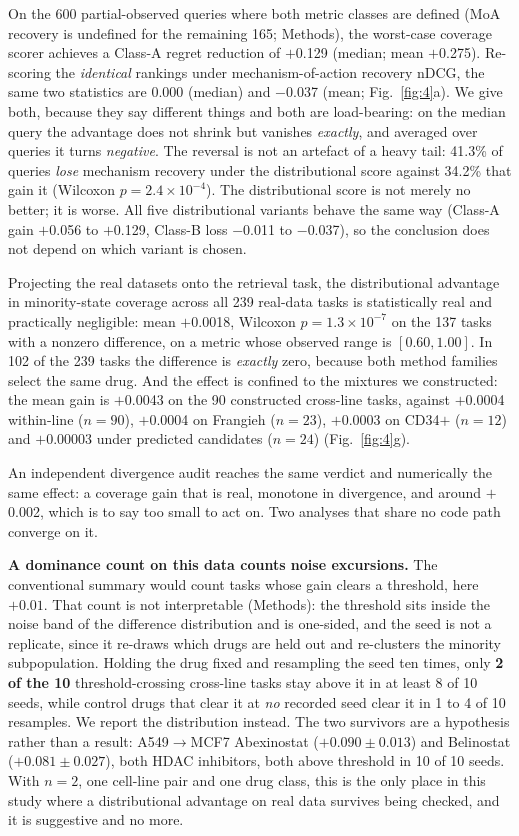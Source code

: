 \documentclass[11pt,letterpaper]{article}
\newcommand{\CONTROLRANGE}{1 to 4}
\begin{document}
On the 600 partial-observed queries where both metric classes are defined (MoA recovery is
undefined for the remaining 165; Methods), the worst-case coverage scorer achieves a Class-A
regret reduction of $+$0.129 (median; mean $+$0.275). Re-scoring the \emph{identical}
rankings under mechanism-of-action recovery nDCG, the same two statistics are 0.000
(median) and $-$0.037 (mean; Fig.~\ref{fig:4}a). We give both, because they say
different things and both are load-bearing: on the median query the advantage does not shrink
but vanishes \emph{exactly}, and averaged over queries it turns \emph{negative}. The reversal is
not an artefact of a heavy tail: 41.3\% of queries \emph{lose} mechanism recovery under the
distributional score against 34.2\% that gain it (Wilcoxon $p = 2.4\times10^{-4}$). The distributional score
is not merely no better; it is worse. All five distributional variants behave the same way (Class-A gain $+$0.056
to $+$0.129, Class-B loss $-$0.011 to $-$0.037), so the conclusion does not depend on which
variant is chosen.

Projecting the real datasets onto the retrieval task, the distributional advantage in
minority-state coverage across all 239 real-data tasks is statistically real and
practically negligible: mean $+$0.0018, Wilcoxon $p = 1.3\times10^{-7}$ on the
137 tasks with a nonzero difference, on a metric whose observed range is $[0.60, 1.00]$.
In 102 of the 239 tasks the difference is \emph{exactly} zero, because both method
families select the same drug. And the effect is confined to the mixtures we
constructed: the mean gain is $+$0.0043 on the 90 constructed cross-line tasks, against
$+$0.0004 within-line ($n = 90$), $+$0.0004 on Frangieh ($n = 23$), $+$0.0003 on CD34$+$
($n = 12$) and $+$0.00003 under predicted candidates ($n = 24$) (Fig.~\ref{fig:4}g).

An independent divergence audit reaches the same verdict and numerically the
same effect: a coverage gain that is real, monotone in divergence, and around $+$0.002,
which is to say too small to act on. Two analyses that share no code path converge on it.

\textbf{A dominance count on this data counts noise excursions.} The conventional summary would
count tasks whose gain clears a threshold, here $+0.01$. That count is not interpretable
(Methods): the threshold sits inside the noise band of the difference distribution and is
one-sided, and the seed is not a replicate, since it re-draws which drugs are held out and
re-clusters the minority subpopulation. Holding the drug fixed and resampling the seed ten times,
only \textbf{2 of the 10} threshold-crossing cross-line tasks stay above it in at least 8 of 10
seeds, while control drugs that clear it at \emph{no} recorded seed clear it in \CONTROLRANGE{} of
10 resamples. We report the distribution instead. The two survivors are a hypothesis rather than a
result: A549$\rightarrow$MCF7 Abexinostat ($+0.090 \pm 0.013$) and Belinostat
($+0.081 \pm 0.027$), both HDAC inhibitors, both above threshold in 10 of 10 seeds. With $n = 2$,
one cell-line pair and one drug class, this is the only place in this study where a distributional
advantage on real data survives being checked, and it is suggestive and no more.
\end{document}
